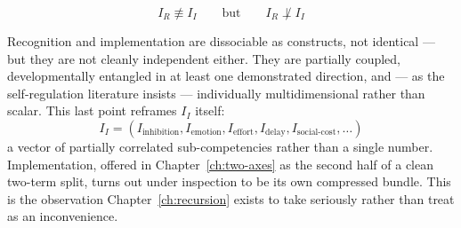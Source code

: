 \begin{repairbox}
\[
I_R \not\equiv I_I \qquad \text{but} \qquad I_R \not\perp I_I
\]

Recognition and implementation are dissociable as constructs, not identical --- but they are not cleanly independent either. They are partially coupled, developmentally entangled in at least one demonstrated direction, and --- as the self-regulation literature insists --- individually multidimensional rather than scalar. This last point reframes $I_I$ itself:
\[
I_I = (I_{\text{inhibition}}, I_{\text{emotion}}, I_{\text{effort}}, I_{\text{delay}}, I_{\text{social-cost}}, \ldots)
\]
a vector of partially correlated sub-competencies rather than a single number. Implementation, offered in Chapter~\ref{ch:two-axes} as the second half of a clean two-term split, turns out under inspection to be its own compressed bundle. This is the observation Chapter~\ref{ch:recursion} exists to take seriously rather than treat as an inconvenience.
\end{repairbox}
